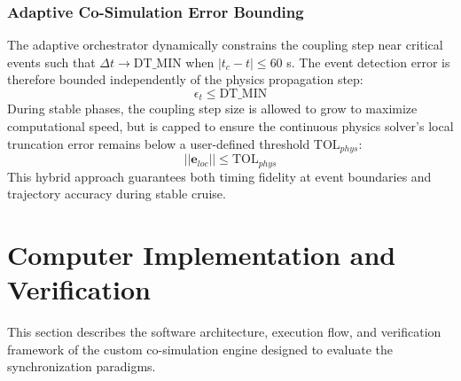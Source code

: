 \documentclass[a4paper,fleqn]{cas-sc}
\begin{document}
\subsubsection{Adaptive Co-Simulation Error Bounding}
The adaptive orchestrator dynamically constrains the coupling step near critical events such that $\Delta t \to \text{DT\_MIN}$ when $|t_c - t| \le 60$ s. The event detection error is therefore bounded independently of the physics propagation step:
\begin{equation}
    \epsilon_t \le \text{DT\_MIN}
\end{equation}
During stable phases, the coupling step size is allowed to grow to maximize computational speed, but is capped to ensure the continuous physics solver's local truncation error remains below a user-defined threshold $\text{TOL}_{phys}$:
\begin{equation}
    ||\mathbf{e}_{loc}|| \le \text{TOL}_{phys}
\end{equation}
This hybrid approach guarantees both timing fidelity at event boundaries and trajectory accuracy during stable cruise.

\section{Computer Implementation and Verification}
\label{sec:implementation}
This section describes the software architecture, execution flow, and verification framework of the custom co-simulation engine designed to evaluate the synchronization paradigms.
\end{document}
